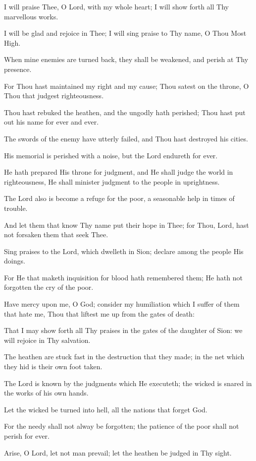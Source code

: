I will praise Thee, O Lord, with my whole heart; I will show forth all Thy marvellous works.

I will be glad and rejoice in Thee; I will sing praise to Thy name, O Thou Most High.

When mine enemies are turned back, they shall be weakened, and perish at Thy presence.

For Thou hast maintained my right and my cause; Thou satest on the throne, O Thou that judgest righteousness.

Thou hast rebuked the heathen, and the ungodly hath perished; Thou hast put out his name for ever and ever.

The swords of the enemy have utterly failed, and Thou hast destroyed his cities.

His memorial is perished with a noise, but the Lord endureth for ever.

He hath prepared His throne for judgment, and He shall judge the world in righteousness, He shall minister judgment to the people in uprightness.

The Lord also is become a refuge for the poor, a seasonable help in times of trouble.

And let them that know Thy name put their hope in Thee; for Thou, Lord, hast not forsaken them that seek Thee.

Sing praises to the Lord, which dwelleth in Sion; declare among the people His doings.

For He that maketh inquisition for blood hath remembered them; He hath not forgotten the cry of the poor.

Have mercy upon me, O God; consider my humiliation which I suffer of them that hate me, Thou that liftest me up from the gates of death:

That I may show forth all Thy praises in the gates of the daughter of Sion: we will rejoice in Thy salvation.

The heathen are stuck fast in the destruction that they made; in the net which they hid is their own foot taken.

The Lord is known by the judgments which He executeth; the wicked is snared in the works of his own hands.

Let the wicked be turned into hell, all the nations that forget God.

For the needy shall not alway be forgotten; the patience of the poor shall not perish for ever.

Arise, O Lord, let not man prevail; let the heathen be judged in Thy sight.

